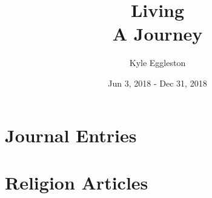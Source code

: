 \documentclass{book}
\title{%
  Living \\
  \large A Journey}
\author{Kyle Eggleston}
\date{Jun 3, 2018 - Dec 31, 2018}
\begin{document}
\maketitle
\thispagestyle{empty}

\frontmatter



\mainmatter

\chapter{Journal Entries}








\chapter{Religion Articles}










\newpage

\appendix




\backmatter
\printbibliography
\end{document}

